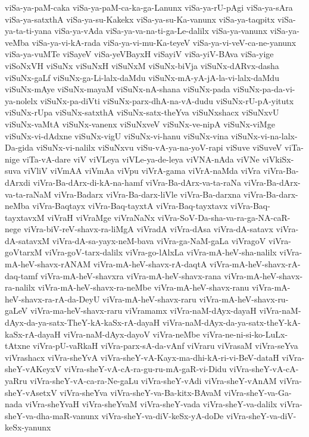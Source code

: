 {viSa-ya-paM-caka
viSa-ya-paM-ca-ka-ga-Lanunx
viSa-ya-rU-pAgi
viSa-ya-sAra
viSa-ya-satxthA
viSa-ya-su-Kakekx
viSa-ya-su-Ka-vanunx
viSa-ya-taqpitx
viSa-ya-ta-ti-yana
viSa-ya-vAda
viSa-ya-va-na-ti-ga-Le-dalilx
viSa-ya-vanunx
viSa-ya-veMba
viSa-ya-vi-kA-rada
viSa-ya-vi-mu-Ka-teyeV
viSa-ya-vi-veV-ca-ne-yanunx
viSa-ya-vuMTe
viSayeV
viSa-yeVBayxH
viSayiV
viSa-yiV-BAva
viSa-yige
viSoNxVH
viSuNx
viSuNxH
viSuNxM
viSuNx-biVja
viSuNx-dARvx-dasha
viSuNx-gaLf
viSuNx-ga-Li-lalx-daMdu
viSuNx-mA-yA-jA-la-vi-lalx-daMdu
viSuNx-mAye
viSuNx-mayaM
viSuNx-nA-shana
viSuNx-pada
viSuNx-pa-da-vi-ya-nolelx
viSuNx-pa-diVti
viSuNx-parx-dhA-na-vA-dudu
viSuNx-rU-pA-yitutx
viSuNx-rUpa
viSuNx-satxthA
viSuNx-satx-theYva
viSuNxshacx
viSuNxvU
viSuNx-vaMtA
viSuNx-vanenx
viSuNxveV
viSuNx-ve-nipA
viSuNx-viMge
viSuNx-vi-dAdxne
viSuNx-vigU
viSuNx-vi-hanu
viSuNx-vina
viSuNx-vi-na-lalx-Da-gida
viSuNx-vi-nalilx
viSuNxvu
viSu-vA-ya-na-yoV-rapi
viSuve
viSuveV
viTa-nige
viTa-vA-dare
viV
viVLeya
viVLe-ya-de-leya
viVNA-nAda
viVNe
viVkiSx-suva
viVliV
viVmAA
viVmAa
viVpu
viVrA-gama
viVrA-naMda
viVra
viVra-Ba-dArxdi
viVra-Ba-dArx-di-kA-na-hamf
viVra-Ba-dArx-va-ta-raNa
viVra-Ba-dArx-va-ta-raNaM
viVra-Badarx
viVra-Ba-darx-liVle
viVra-Ba-darxna
viVra-Ba-darx-neMba
viVra-Baqtayx
viVra-Baq-tayxtA
viVra-Baq-tayxtavx
viVra-Baq-tayxtavxM
viVraH
viVraMge
viVraNaNx
viVra-SoV-Da-sha-va-ra-ga-NA-caR-nege
viVra-biV-reV-shavx-ra-liMgA
viVradA
viVra-dAsa
viVra-dA-satavx
viVra-dA-satavxM
viVra-dA-sa-yayx-neM-bava
viVra-ga-NaM-gaLa
viVragoV
viVra-goVtarxM
viVra-goV-tarx-dalilx
viVra-go-lAlxLa
viVra-mA-heV-sha-nalilx
viVra-mA-heV-shavx-rANAM
viVra-mA-heV-shavx-rA-daqtA
viVra-mA-heV-shavx-rA-daq-tamf
viVra-mA-heV-shavxra
viVra-mA-heV-shavx-rana
viVra-mA-heV-shavx-ra-nalilx
viVra-mA-heV-shavx-ra-neMbe
viVra-mA-heV-shavx-ranu
viVra-mA-heV-shavx-ra-rA-da-DeyU
viVra-mA-heV-shavx-raru
viVra-mA-heV-shavx-ru-gaLeV
viVra-ma-heV-shavx-raru
viVramamx
viVra-naM-dAyx-dayaH
viVra-naM-dAyx-da-ya-satx-TheY-kA-kaSx-rA-dayaH
viVra-naM-dAyx-da-ya-satx-theY-kA-kaSx-rA-dayaH
viVra-naM-dAyx-dayoV
viVra-neMbe
viVra-ne-ni-si-ko-LuLx-tAtxne
viVra-pU-vaRkaH
viVra-parx-sA-da-vAnf
viVraru
viVrasaM
viVra-seYva
viVrashacx
viVra-sheYvA
viVra-sheY-vA-Kayx-ma-dhi-kA-ri-vi-BeV-dataH
viVra-sheY-vAKeyxV
viVra-sheY-vA-cA-ra-gu-ru-mA-gaR-vi-Didu
viVra-sheY-vA-cA-yaRru
viVra-sheY-vA-ca-ra-Ne-gaLu
viVra-sheY-vAdi
viVra-sheY-vAnAM
viVra-sheY-vAsetxV
viVra-sheYva
viVra-sheY-va-Ba-kitx-BAvaM
viVra-sheY-va-Ga-nada
viVra-sheYvaH
viVra-sheYvaM
viVra-sheY-vada
viVra-sheY-va-dalilx
viVra-sheY-va-dha-maR-vanunx
viVra-sheY-va-diV-keSx-yA-doDe
viVra-sheY-va-diV-keSx-yanunx
}
